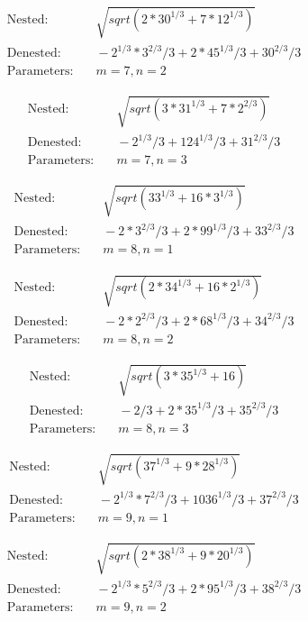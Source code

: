 \begin{align*}
\text{Nested:} &\quad \sqrt{sqrt(2*30^{1/3} + 7*12^{1/3})} \\
\text{Denested:} &\quad -2^{1/3}*3^{2/3}/3 + 2*45^{1/3}/3 + 30^{2/3}/3 \\
\text{Parameters:} &\quad m=7, n=2
\end{align*}

\begin{align*}
\text{Nested:} &\quad \sqrt{sqrt(3*31^{1/3} + 7*2^{2/3})} \\
\text{Denested:} &\quad -2^{1/3}/3 + 124^{1/3}/3 + 31^{2/3}/3 \\
\text{Parameters:} &\quad m=7, n=3
\end{align*}

\begin{align*}
\text{Nested:} &\quad \sqrt{sqrt(33^{1/3} + 16*3^{1/3})} \\
\text{Denested:} &\quad -2*3^{2/3}/3 + 2*99^{1/3}/3 + 33^{2/3}/3 \\
\text{Parameters:} &\quad m=8, n=1
\end{align*}

\begin{align*}
\text{Nested:} &\quad \sqrt{sqrt(2*34^{1/3} + 16*2^{1/3})} \\
\text{Denested:} &\quad -2*2^{2/3}/3 + 2*68^{1/3}/3 + 34^{2/3}/3 \\
\text{Parameters:} &\quad m=8, n=2
\end{align*}

\begin{align*}
\text{Nested:} &\quad \sqrt{sqrt(3*35^{1/3} + 16)} \\
\text{Denested:} &\quad -2/3 + 2*35^{1/3}/3 + 35^{2/3}/3 \\
\text{Parameters:} &\quad m=8, n=3
\end{align*}

\begin{align*}
\text{Nested:} &\quad \sqrt{sqrt(37^{1/3} + 9*28^{1/3})} \\
\text{Denested:} &\quad -2^{1/3}*7^{2/3}/3 + 1036^{1/3}/3 + 37^{2/3}/3 \\
\text{Parameters:} &\quad m=9, n=1
\end{align*}

\begin{align*}
\text{Nested:} &\quad \sqrt{sqrt(2*38^{1/3} + 9*20^{1/3})} \\
\text{Denested:} &\quad -2^{1/3}*5^{2/3}/3 + 2*95^{1/3}/3 + 38^{2/3}/3 \\
\text{Parameters:} &\quad m=9, n=2
\end{align*}

